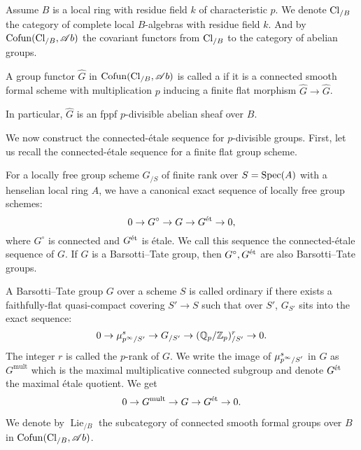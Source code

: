 \documentclass[twoside]{article}
\begin{document}
Assume $B$ is a local ring with residue field $k$ of characteristic $p$.
We denote $\operatorname{Cl}_{/B}$ the category of complete local $B$-algebras 
with residue field $k$.
And by $\operatorname{Cofun}(\operatorname{Cl}_{/B},\mathscr{A}b)$ the covariant functors from $\operatorname{Cl}_{/B}$ to the category of abelian groups.

\begin{definition}\label{def-csfg}
    A group functor $\hat{G}$ in $\operatorname{Cofun} (\operatorname{Cl}_{/B},\mathscr{A}b)$ is called a
     if it is a connected smooth formal scheme
    with multiplication $p$ inducing a finite flat morphism $\hat{G}\to \hat{G}$.
    
    In particular, $\hat{G}$ is an fppf $p$-divisible abelian sheaf over $B$.
\end{definition}

We now construct the connected-\'etale sequence for $p$-divisible groups.
First, let us recall the connected-\'etale sequence for a finite flat group scheme.

\begin{proposition}
    For a locally free group scheme $G_{/S}$ of finite rank 
    over $S=\operatorname{Spec}(A)$ with a henselian local ring $A$,
    we have a canonical exact sequence of locally free group schemes:
    \[ 0\to G^{\circ}\to G\to G^{\textup{\'et}} \to 0, \]
    where $G^{\circ}$ is connected and $G^{\textup{\'et}}$ is \'etale.
    We call this sequence the connected-\'etale sequence of $G$.
    If $G$ is a Barsotti--Tate group,
    then $G^{\circ},G^{\textup{\'et}}$ are also Barsotti--Tate groups.
\end{proposition}

\begin{definition} 
    A Barsotti--Tate group $G$ over a scheme $S$ is called ordinary 
    if there exists a faithfully-flat quasi-compact covering $S'\to S$
    such that over $S'$, $G_{S'}$ sits into the exact sequence:
    \[ 0\to \mu_{p^{\infty}/S'}^{s}\to G_{/S'} \to (\mathbb{Q}_{p}/\mathbb{Z}_{p})^{r}_{/S'} \to 0. \]
    The integer $r$ is called the $p$-rank of $G$.
    We write the image of $\mu_{\smash{p^{\infty}/S'}}^{s}$ in $G$ as $G^{\mathrm{mult}}$ 
    which is the maximal multiplicative connected subgroup and denote $G^{\textup{\'et}}$ the maximal \'etale quotient.
    We get 
    \[ 0\to G^{\mathrm{mult}} \to G\to G^{\textup{\'et}} \to 0. \]
\end{definition}

We denote by $\operatorname{Lie}_{/B}$ the subcategory of 
connected smooth formal groups over $B$ in $\operatorname{Cofun}(\operatorname{Cl}_{/B},\mathscr{A}b)$.
\end{document}

